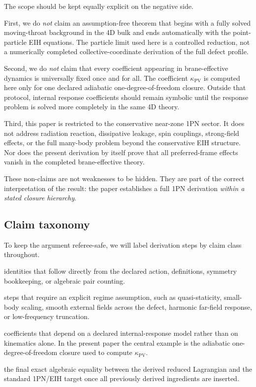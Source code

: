 \documentclass[11pt]{article}
\newcommand{\kPV}{\kappa_{\mathrm{PV}}}
\begin{document}
The scope should be kept equally explicit on the negative side.

First, we do \emph{not} claim an assumption-free theorem that begins with a fully solved moving-throat background in the 4D bulk and ends automatically with the point-particle EIH equations. The particle limit used here is a controlled reduction, not a numerically completed collective-coordinate derivation of the full defect profile.

Second, we do \emph{not} claim that every coefficient appearing in brane-effective dynamics is universally fixed once and for all. The coefficient \(\kPV\) is computed here only for one declared adiabatic one-degree-of-freedom closure. Outside that protocol, internal response coefficients should remain symbolic until the response problem is solved more completely in the same 4D theory.

Third, this paper is restricted to the conservative near-zone 1PN sector. It does not address radiation reaction, dissipative leakage, spin couplings, strong-field effects, or the full many-body problem beyond the conservative EIH structure. Nor does the present derivation by itself prove that all preferred-frame effects vanish in the completed brane-effective theory.

These non-claims are not weaknesses to be hidden. They are part of the correct interpretation of the result: the paper establishes a full 1PN derivation \emph{within a stated closure hierarchy}.

\subsection{Claim taxonomy}
\label{sec:taxonomy}

To keep the argument referee-safe, we will label derivation steps by claim class throughout.
\begin{description}[leftmargin=1.8em,style=nextline]
  \item[\textbf{Exact}] identities that follow directly from the declared action, definitions, symmetry bookkeeping, or algebraic pair counting.
  \item[\textbf{Controlled reduction}] steps that require an explicit regime assumption, such as quasi-staticity, small-body scaling, smooth external fields across the defect, harmonic far-field response, or low-frequency truncation.
  \item[\textbf{Protocol closure}] coefficients that depend on a declared internal-response model rather than on kinematics alone. In the present paper the central example is the adiabatic one-degree-of-freedom closure used to compute \(\kPV\).
  \item[\textbf{Full assembly}] the final exact algebraic equality between the derived reduced Lagrangian and the standard 1PN/EIH target once all previously derived ingredients are inserted.
\end{description}
\end{document}
